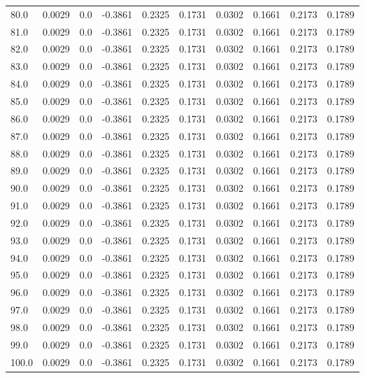 \begin{longtable}{lrrrrrrrrr}
80.0 & 0.0029 & 0.0 & -0.3861 & 0.2325 & 0.1731 & 0.0302 & 0.1661 & 0.2173 & 0.1789 \\
81.0 & 0.0029 & 0.0 & -0.3861 & 0.2325 & 0.1731 & 0.0302 & 0.1661 & 0.2173 & 0.1789 \\
82.0 & 0.0029 & 0.0 & -0.3861 & 0.2325 & 0.1731 & 0.0302 & 0.1661 & 0.2173 & 0.1789 \\
83.0 & 0.0029 & 0.0 & -0.3861 & 0.2325 & 0.1731 & 0.0302 & 0.1661 & 0.2173 & 0.1789 \\
84.0 & 0.0029 & 0.0 & -0.3861 & 0.2325 & 0.1731 & 0.0302 & 0.1661 & 0.2173 & 0.1789 \\
85.0 & 0.0029 & 0.0 & -0.3861 & 0.2325 & 0.1731 & 0.0302 & 0.1661 & 0.2173 & 0.1789 \\
86.0 & 0.0029 & 0.0 & -0.3861 & 0.2325 & 0.1731 & 0.0302 & 0.1661 & 0.2173 & 0.1789 \\
87.0 & 0.0029 & 0.0 & -0.3861 & 0.2325 & 0.1731 & 0.0302 & 0.1661 & 0.2173 & 0.1789 \\
88.0 & 0.0029 & 0.0 & -0.3861 & 0.2325 & 0.1731 & 0.0302 & 0.1661 & 0.2173 & 0.1789 \\
89.0 & 0.0029 & 0.0 & -0.3861 & 0.2325 & 0.1731 & 0.0302 & 0.1661 & 0.2173 & 0.1789 \\
90.0 & 0.0029 & 0.0 & -0.3861 & 0.2325 & 0.1731 & 0.0302 & 0.1661 & 0.2173 & 0.1789 \\
91.0 & 0.0029 & 0.0 & -0.3861 & 0.2325 & 0.1731 & 0.0302 & 0.1661 & 0.2173 & 0.1789 \\
92.0 & 0.0029 & 0.0 & -0.3861 & 0.2325 & 0.1731 & 0.0302 & 0.1661 & 0.2173 & 0.1789 \\
93.0 & 0.0029 & 0.0 & -0.3861 & 0.2325 & 0.1731 & 0.0302 & 0.1661 & 0.2173 & 0.1789 \\
94.0 & 0.0029 & 0.0 & -0.3861 & 0.2325 & 0.1731 & 0.0302 & 0.1661 & 0.2173 & 0.1789 \\
95.0 & 0.0029 & 0.0 & -0.3861 & 0.2325 & 0.1731 & 0.0302 & 0.1661 & 0.2173 & 0.1789 \\
96.0 & 0.0029 & 0.0 & -0.3861 & 0.2325 & 0.1731 & 0.0302 & 0.1661 & 0.2173 & 0.1789 \\
97.0 & 0.0029 & 0.0 & -0.3861 & 0.2325 & 0.1731 & 0.0302 & 0.1661 & 0.2173 & 0.1789 \\
98.0 & 0.0029 & 0.0 & -0.3861 & 0.2325 & 0.1731 & 0.0302 & 0.1661 & 0.2173 & 0.1789 \\
99.0 & 0.0029 & 0.0 & -0.3861 & 0.2325 & 0.1731 & 0.0302 & 0.1661 & 0.2173 & 0.1789 \\
100.0 & 0.0029 & 0.0 & -0.3861 & 0.2325 & 0.1731 & 0.0302 & 0.1661 & 0.2173 & 0.1789 \\

\end{longtable}
